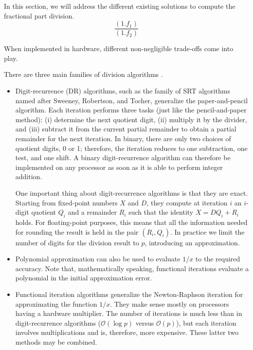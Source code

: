 In this section, we will address the different existing solutions to compute the fractional part division.
\begin{equation}
\frac{(1.f_1)}{(1.f_2)}
\end{equation}

When implemented in hardware, different non-negligible trade-offs come into play.

There are three main families of division algorithms \cite{muller_hardware_2010}. 

\begin{itemize}

\item Digit-recurrence (DR) algorithms, such as the family of SRT algorithms named after Sweeney, Robertson, and Tocher, %
generalize the paper-and-pencil algorithm. Each iteration performs three tasks (just like the pencil-and-paper method): (i) determine the next quotient digit, (ii) multiply it by the divider, and (iii) subtract it from the current partial remainder to obtain a partial remainder for the next iteration.
In binary, there are only two choices of quotient digits, 0 or 1; therefore, the iteration reduces to one subtraction, one test, and one shift. 
A binary digit-recurrence algorithm can therefore be implemented on any processor as soon as it is able to perform integer addition.

One important thing about digit-recurrence algorithms is that they are exact. Starting from fixed-point numbers $X$ and $D$, they compute at iteration $i$ an $i$-digit quotient $Q_i$ and a remainder $R_i$ such that the identity $X = DQ_i + R_i$ holds.
For floating-point purposes, this means that all the information needed for rounding the result is held in the pair $(R_i, Q_i)$. In practice we limit the number of digits for the division result to $p$, introducing an approximation.


\item Polynomial approximation can also be used to evaluate $1/x$ to the required accuracy. %
Note that, mathematically speaking, functional iterations evaluate a polynomial in the initial approximation error. %

\item Functional iteration algorithms generalize the Newton-Raphson iteration for approximating the function $1/x$. They make sense mostly on processors having a hardware multiplier. The number of iterations is much less than in digit-recurrence algorithms ($\mathcal{O}(\log p)$ versus $\mathcal{O}(p)$), but each iteration involves multiplications and is, therefore, more expensive. These latter two methods may be combined.
\end{itemize}

